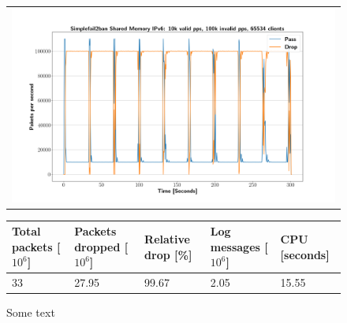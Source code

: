 \begin{figure}[p]
	\label{fig:simplefail2ban:shm:ip6:100k}
	\centering
	\scriptsize
	\begin{tabular}{c}
    	\centerline{\includegraphics[width=1.2\textwidth]{images/simplefail2ban_shm_ipv6_v10k_iv100k_c65534.png}}
	\end{tabular}
	\begin{tabular}{lllll}
		\toprule
		\textbf{Total packets [$10^6$]} & \textbf{Packets dropped [$10^6$]} & \textbf{Relative drop [\%]} & \textbf{Log messages [$10^6$]} & \textbf{CPU [seconds]} \\ \midrule 
		33 & 27.95 & 99.67 & 2.05 & 15.55 \\
		\bottomrule
	\end{tabular}
	\caption[Simplefail2ban Shared Memory IPv6 100k PPS]{Some text}
\end{figure}

